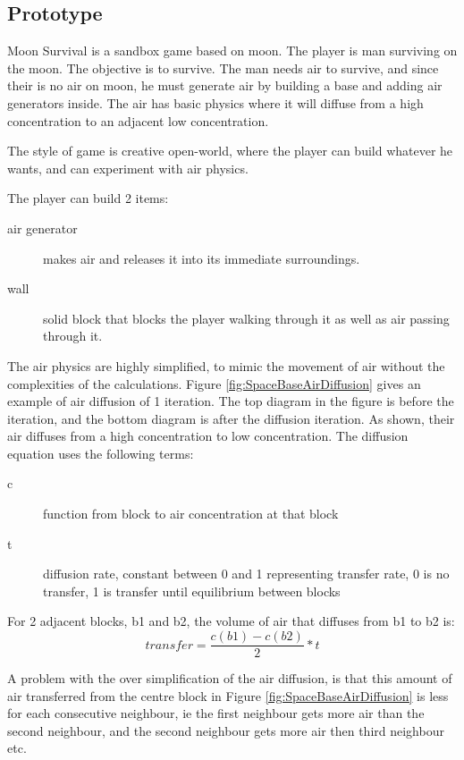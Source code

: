 \subsection{\prototypeSiddall Prototype}


Moon Survival is a sandbox game based on moon.
The player is man surviving on the moon.
The objective is to survive.
The man needs air to survive, and since their is no air on moon, he must generate air by building a base and adding air generators inside.
The air has basic physics where it will diffuse from a high concentration to an adjacent low concentration.

The style of game is creative open-world, where the player can build whatever he wants, and can experiment with air physics.

The player can build 2 items: 
\begin{description}
\item[air generator] makes air and releases it into its immediate surroundings. 
\item[wall] solid block that blocks the player walking through it as well as air passing through it.
\end{description}

The air physics are highly simplified, to mimic the movement of air without the complexities of the calculations.
Figure \ref{fig:SpaceBaseAirDiffusion} gives an example of air diffusion of 1 iteration. The top diagram in the figure is before the iteration, and the bottom diagram is after the diffusion iteration.
As shown, their air diffuses from a high concentration to low concentration.
The diffusion equation uses the following terms:
\begin{description}
\item[c] function from block to air concentration at that block
\item[t] diffusion rate, constant between 0 and 1 representing transfer rate, 0 is no transfer, 1 is transfer until equilibrium between blocks
\end{description}

For 2 adjacent blocks, b1 and b2, the volume of air that diffuses from b1 to b2 is:
$$ transfer = \frac{c(b1) - c(b2)}{2} * t $$

A problem with the over simplification of the air diffusion, is that this amount of air transferred from the centre block in Figure \ref{fig:SpaceBaseAirDiffusion} is less for each consecutive neighbour, ie the first neighbour gets more air than the second neighbour, and the second neighbour gets more air then third neighbour etc.


